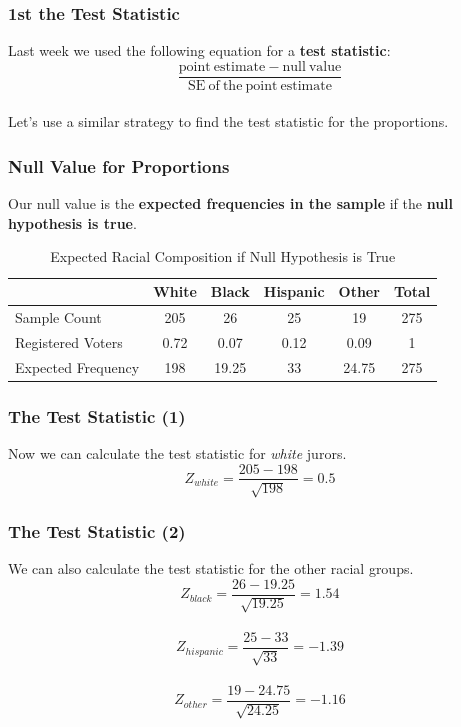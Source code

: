 \documentclass{beamer}\usepackage{graphicx, color}
\begin{document}

\begin{frame}[fragile]
  \frametitle{1st the Test Statistic}
  Last week we used the following equation for a {\bf{test statistic}}:
  \[
  \frac{\mathrm{point\:estimate} - \mathrm{null\:value}}{\mathrm{SE\:of\:the\:point\:estimate}}
  \] \\[0.5cm]
  Let's use a similar strategy to find the test statistic for the proportions.
\end{frame}


\begin{frame}[fragile]
  \frametitle{Null Value for Proportions}
  Our null value is the {\bf{expected frequencies in the sample}} if the {\bf{null hypothesis is true}}.
  \begin{table}
    \caption{Expected Racial Composition if Null Hypothesis is True}
    \begin{tabular}{l c c c c c}
    \hline
    & White & Black & Hispanic & Other & Total \\
    \hline\hline
    Sample Count & 205 & 26 & 25 & 19 & 275 \\ 
    Registered Voters & 0.72 & 0.07 & 0.12 & 0.09 & 1 \\ \hline
    Expected Frequency & 198 & 19.25 & 33 & 24.75 & 275 \\
    \hline
    \end{tabular}
  \end{table}
\end{frame}

\begin{frame}[fragile]
 \frametitle{The Test Statistic (1)}
 Now we can calculate the test statistic for {\emph{white}} jurors. \\[0.5cm]
 \[
 Z_{white} = \frac{205 - 198}{\sqrt{198}} = 0.5
 \]
\end{frame}

\begin{frame}[fragile]
 \frametitle{The Test Statistic (2)}
 We can also calculate the test statistic for the other racial groups. \\[0.5cm]
 \[
 Z_{black} = \frac{26 - 19.25}{\sqrt{19.25}} = 1.54
 \] \\[0.3cm]
  \[
 Z_{hispanic} = \frac{25 - 33}{\sqrt{33}} = -1.39
 \]\\[0.3cm]
  \[
 Z_{other} = \frac{19 - 24.75}{\sqrt{24.25}} = -1.16
 \]\\[0.3cm]
\end{frame}
\end{document}
